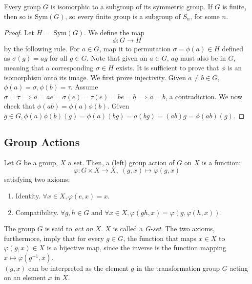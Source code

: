 \documentclass{article}
\begin{document}
  \begin{theorem}
    Every group $G$ is isomorphic to a subgroup of its symmetric group. If $G$ is finite, then so is Sym$(G)$, so every finite group is a subgroup of $S_{n}$, for some $n$.
  \end{theorem}
  \begin{proof}
    Let $H =$ Sym$(G)$. We define the map
    \begin{equation}
      \phi: G \longrightarrow H
    \end{equation}
    by the following rule. For $a \in G$, map it to permutation $\sigma = \phi (a) \in H$ defined as $\sigma(g) = a g$ for all $g \in G$. Note that given an $a \in G$, $a g$ must also be in $G$, meaning that a corresponding $\sigma \in H$ exists. It is sufficient to prove that $\phi$ is an isomorphism onto its image. We first prove injectivity. Given $a \neq b \in G$, $\phi(a)=\sigma, \phi(b) = \tau$. Assume $\sigma = \tau \implies a = a e =  \sigma(e) = \tau (e) = b e = b \implies a = b$, a contradiction. We now check that $\phi(a b) = \phi(a) \phi(b)$. Given $g \in G, \phi(a) \phi(b) (g) = \phi(a) (bg) = a(bg)= (ab) g = \phi(ab) (g).$
  \end{proof}

\subsection{Group Actions}

  \begin{definition}
    Let $G$ be a group, $X$ a set. Then, a (left) group action of $G$ on $X$ is a function: 
    \[ \varphi: G \times X \longrightarrow X, \; (g,x) \longmapsto \varphi(g,x)\]
    satisfying two axioms:
    \begin{enumerate}
      \item Identity. $\forall x \in X, \varphi(e, x) = x$. 
      \item Compatibility. $\forall g, h \in G \text{ and } \forall x \in X, \varphi(gh, x) = \varphi(g, \varphi(h, x))$.
    \end{enumerate}
    The group $G$ is said to \textit{act on} $X$. $X$ is called a \textit{G-set}. The two axioms, furthermore, imply that for every $g \in G$, the function that maps $x \in X$ to $ \varphi(g, x) \in X$ is a bijective map, since the inverse is the function mapping $x \mapsto \varphi(g^{-1}, x)$. \\
    $(g, x)$ can be interpreted as the element $g$ in the transformation group $G$ acting on an element $x$ in $X$.
  \end{definition}
\end{document}

